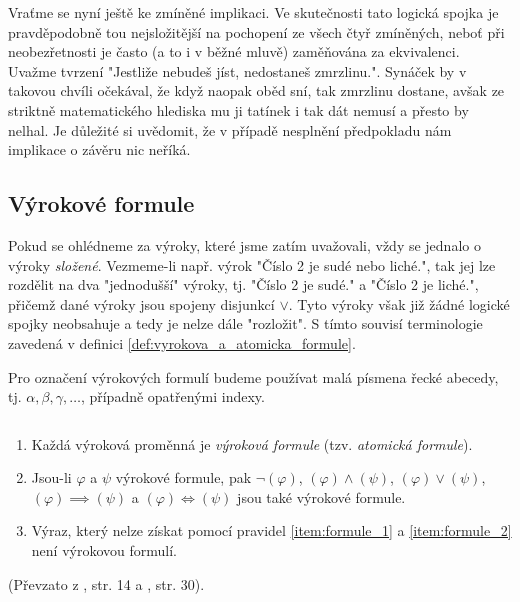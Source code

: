 Vraťme se nyní ještě ke zmíněné implikaci. Ve skutečnosti tato logická spojka je pravděpodobně tou nejsložitější na pochopení ze všech čtyř zmíněných, neboť při neobezřetnosti je často (a to i v běžné mluvě) zaměňována za ekvivalenci. Uvažme tvrzení "Jestliže nebudeš jíst, nedostaneš zmrzlinu.". Synáček by v takovou chvíli očekával, že když naopak oběd sní, tak zmrzlinu dostane, avšak ze striktně matematického hlediska mu ji tatínek i tak dát nemusí a přesto by nelhal. Je důležité si uvědomit, že v případě nesplnění předpokladu nám implikace o závěru nic neříká.\par

\subsection{Výrokové formule}
Pokud se ohlédneme za výroky, které jsme zatím uvažovali, vždy se jednalo o výroky \emph{složené}. Vezmeme-li např. výrok "Číslo 2 je sudé nebo liché.", tak jej lze rozdělit na dva "jednodušší" výroky, tj. "Číslo 2 je sudé." a "Číslo 2 je liché.", přičemž dané výroky jsou spojeny disjunkcí $\lor$. Tyto výroky však již žádné logické spojky neobsahuje a tedy je nelze dále "rozložit". S tímto souvisí terminologie zavedená v definici \ref{def:vyrokova_a_atomicka_formule}.

\begin{convention}
    Pro označení výrokových formulí budeme používat malá písmena řecké abecedy, tj. $\alpha,\beta,\gamma,\ldots$, případně opatřenými indexy.
\end{convention}

\begin{definition}\label{def:vyrokova_a_atomicka_formule}
    $ $\par
    \begin{enumerate}[label=(\roman*)]
        \item\label{item:formule_1} Každá výroková proměnná je \emph{výroková formule} (tzv. \emph{atomická formule}).
        \item\label{item:formule_2} Jsou-li $\varphi$ a $\psi$ výrokové formule, pak $\neg (\varphi)$, $(\varphi) \land (\psi)$, $(\varphi) \lor (\psi)$, $(\varphi) \implies (\psi)$ a $(\varphi) \iff (\psi)$ jsou také výrokové formule.
        \item\label{item:formule_3} Výraz, který nelze získat pomocí pravidel \ref{item:formule_1} a \ref{item:formule_2} není výrokovou formulí.
    \end{enumerate}
\end{definition}
(Převzato z \cite{Fuchs2003}, str. 14 a \cite{BalcarStepanek1986}, str. 30).

